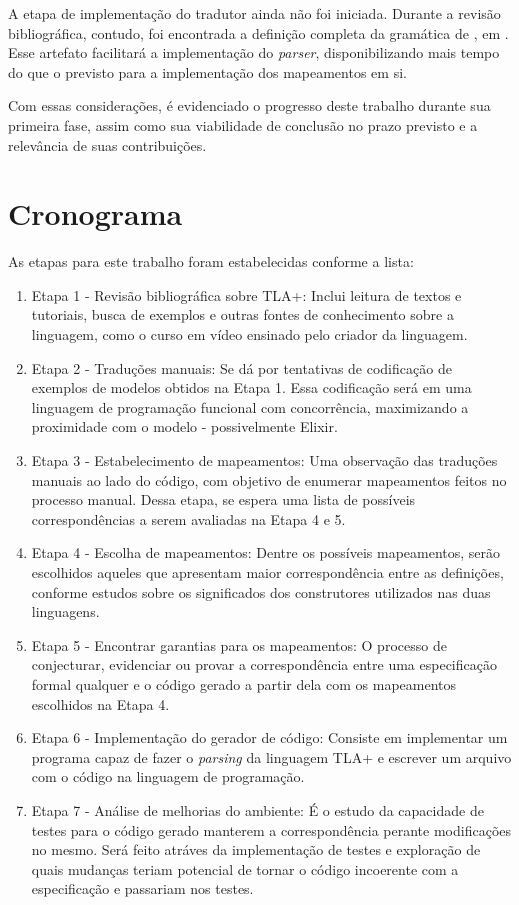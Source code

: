 A etapa de implementação do tradutor ainda não foi iniciada. Durante a revisão bibliográfica, contudo, foi encontrada a definição completa da gramática de \TLAA, em \cite{specifying-systems}. Esse artefato facilitará a implementação do \textit{parser}, disponibilizando mais tempo do que o previsto para a implementação dos mapeamentos em si.

Com essas considerações, é evidenciado o progresso deste trabalho durante sua primeira fase, assim como sua viabilidade de conclusão no prazo previsto e a relevância de suas contribuições.

\section{Cronograma}
\label{cronograma}

As etapas para este trabalho foram estabelecidas conforme a lista:

\begin{enumerate}
  \item Etapa 1 - Revisão bibliográfica sobre TLA+: Inclui leitura de textos e tutoriais, busca de exemplos e outras fontes de conhecimento sobre a linguagem, como o curso em vídeo ensinado pelo criador da linguagem.
  \item Etapa 2 - Traduções manuais: Se dá por tentativas de codificação de exemplos de modelos obtidos na Etapa 1. Essa codificação será em uma linguagem de programação funcional com concorrência, maximizando a proximidade com o modelo - possivelmente Elixir.
  \item Etapa 3 - Estabelecimento de mapeamentos: Uma observação das traduções manuais ao lado do código, com objetivo de enumerar mapeamentos feitos no processo manual. Dessa etapa, se espera uma lista de possíveis correspondências a serem avaliadas na Etapa 4 e 5.
  \item Etapa 4 - Escolha de mapeamentos: Dentre os possíveis mapeamentos, serão escolhidos aqueles que apresentam maior correspondência entre as definições, conforme estudos sobre os significados dos construtores utilizados nas duas linguagens.
  \item Etapa 5 - Encontrar garantias para os mapeamentos: O processo de conjecturar, evidenciar ou provar a correspondência entre uma especificação formal qualquer e o código gerado a partir dela com os mapeamentos escolhidos na Etapa 4.
  \item Etapa 6 - Implementação do gerador de código: Consiste em implementar um programa capaz de fazer o \textit{parsing} da linguagem TLA+ e escrever um arquivo com o código na linguagem de programação.
  \item Etapa 7 - Análise de melhorias do ambiente: É o estudo da capacidade de testes para o código gerado manterem a correspondência perante modificações no mesmo. Será feito atráves da implementação de testes e exploração de quais mudanças teriam potencial de tornar o código incoerente com a especificação e passariam nos testes.
\end{enumerate}

